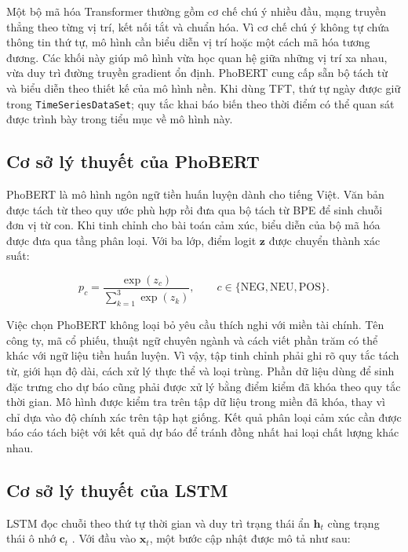 Một bộ mã hóa Transformer thường gồm cơ chế chú ý nhiều đầu, mạng truyền thẳng theo
từng vị trí, kết nối tắt và chuẩn hóa. Vì cơ chế chú ý không tự chứa thông tin thứ tự,
mô hình cần biểu diễn vị trí hoặc một cách mã hóa tương đương. Các khối này giúp mô
hình vừa học quan hệ giữa những vị trí xa nhau, vừa duy trì đường truyền gradient ổn
định. PhoBERT cung cấp sẵn bộ tách từ và biểu diễn theo thiết kế của mô hình nền. Khi
dùng TFT, thứ tự ngày được giữ trong \texttt{TimeSeriesDataSet}; quy tắc khai báo biến
theo thời điểm có thể quan sát được trình bày trong tiểu mục về mô hình này.

\subsection{Cơ sở lý thuyết của PhoBERT}

PhoBERT là mô hình ngôn ngữ tiền huấn luyện dành cho tiếng Việt. Văn bản được tách từ
theo quy ước phù hợp rồi đưa qua bộ tách từ BPE để sinh chuỗi đơn vị từ con. Khi tinh
chỉnh cho bài toán cảm xúc, biểu diễn của bộ mã hóa được đưa qua tầng phân loại. Với ba
lớp, điểm logit $\mathbf{z}$ được chuyển thành xác suất:

\begin{equation}
  p_c=\frac{\exp(z_c)}{\sum_{k=1}^{3}\exp(z_k)},
  \qquad c\in\{\mathrm{NEG},\mathrm{NEU},\mathrm{POS}\}.
  \label{eq:sentiment-softmax}
\end{equation}

Việc chọn PhoBERT không loại bỏ yêu cầu thích nghi với miền tài chính. Tên công ty, mã
cổ phiếu, thuật ngữ chuyên ngành và cách viết phần trăm có thể khác với ngữ liệu tiền
huấn luyện. Vì vậy, tập tinh chỉnh phải ghi rõ quy tắc tách từ, giới hạn độ dài, cách
xử lý thực thể và loại trùng. Phần dữ liệu dùng để sinh đặc trưng cho dự báo cũng phải
được xử lý bằng điểm kiểm đã khóa theo quy tắc thời gian. Mô hình được kiểm tra trên tập
dữ liệu trong miền đã khóa, thay vì chỉ dựa vào độ chính xác trên tập hạt giống. Kết quả
phân loại cảm xúc cần được báo cáo tách biệt với kết quả dự báo để tránh đồng nhất hai
loại chất lượng khác nhau.

\subsection{Cơ sở lý thuyết của LSTM}

LSTM đọc chuỗi theo thứ tự thời gian và duy trì trạng thái ẩn $\mathbf{h}_t$ cùng trạng
thái ô nhớ $\mathbf{c}_t$ \cite{Hochreiter1997_lstm}. Với đầu vào $\mathbf{x}_t$, một
bước cập nhật được mô tả như sau:

